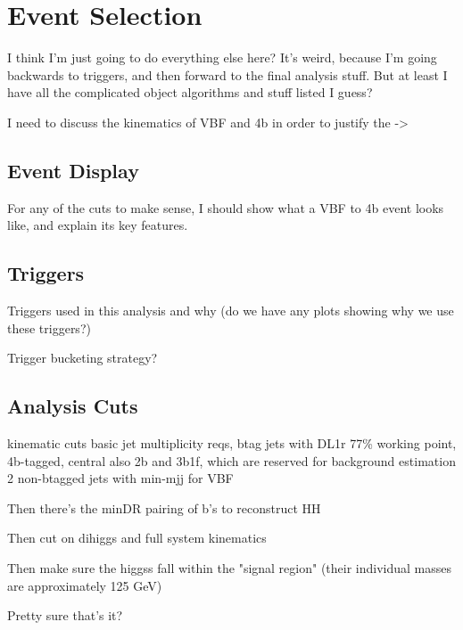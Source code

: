 \chapter{Event Selection}
    
    I think I'm just going to do everything else here? It's weird, because I'm going backwards to triggers,
        and then forward to the final analysis stuff. But at least I have all the complicated object algorithms and stuff listed I guess?

    I need to discuss the kinematics of VBF and 4b in order to justify the ->


    \section{Event Display}
        For any of the cuts to make sense, I should show what a VBF to 4b event looks like,
            and explain its key features.

    \section{Triggers}

        Triggers used in this analysis and why (do we have any plots showing why we use these triggers?)

        Trigger bucketing strategy?

    \section{Analysis Cuts} 

    kinematic cuts
        basic jet multiplicity reqs,
        btag jets with DL1r 77\% working point,
        4b-tagged, central
        also 2b and 3b1f, which are reserved for background estimation
        2 non-btagged jets with min-mjj for VBF

    Then there's the minDR pairing of b's to reconstruct HH

    Then cut on dihiggs and full system kinematics

    Then make sure the higgss fall within the "signal region" (their individual masses are approximately 125 GeV)

    Pretty sure that's it?



%
